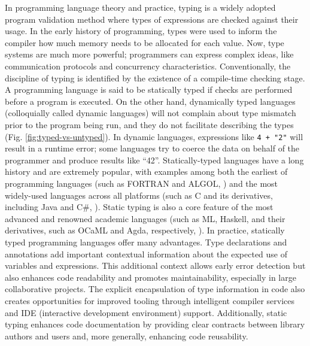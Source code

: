 In programming language theory and practice, typing is a widely adopted program validation method where types of expressions are checked against their usage. In the early history of programming, types were used to inform the compiler how much memory needs to be allocated for each value. Now, type systems are much more powerful; programmers can express complex ideas, like communication protocols and concurrency characteristics. Conventionally, the discipline of typing is identified by the existence of a compile-time checking stage. A programming language is said to be statically typed if checks are performed before a program is executed.  On the other hand, dynamically typed languages (colloquially called dynamic languages) will not complain about type mismatch prior to the program being run, and they do not facilitate describing the types (Fig. \ref{fig:typed-vs-untyped}). In dynamic languages, expressions like \texttt{4 + "2"} will result in a runtime error; some languages try to coerce the data on behalf of the programmer and produce results like ``42''. Statically-typed languages have a long history and are extremely popular, with examples among both the earliest of programming languages (such as FORTRAN and ALGOL, \cite{Backus1978-xt}) and the most widely-used languages across all platforms  (such as C and its derivatives, including Java and C\#, \cite{Ritchie1978-pa}). Static typing is also a core feature of the most advanced and renowned academic languages (such as ML, Haskell, and their derivatives, such as OCaML and Agda, respectively, \cite{Hudak2007-kn}). In practice, statically typed programming languages offer many advantages. Type declarations and annotations add important contextual information about the expected use of variables and expressions. This additional context allows early error detection but also enhances code readability and promotes maintainability, especially in large collaborative projects. The explicit encapsulation of type information in code also creates opportunities for improved tooling through intelligent compiler services and IDE (interactive development environment) support. Additionally, static typing enhances code documentation by providing clear contracts between library authors and users and, more generally, enhancing code reusability.


